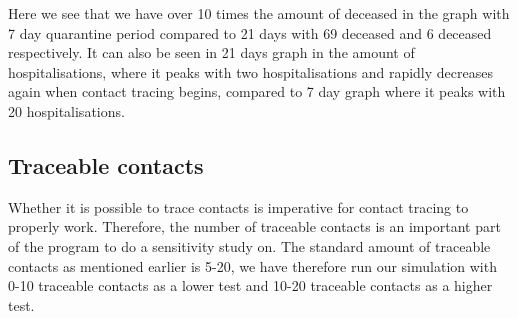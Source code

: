 Here we see that we have over 10 times the amount of deceased in the graph with 7 day quarantine period compared to 21 days with 69 deceased and 6 deceased respectively. It can also be seen in 21 days graph in the amount of hospitalisations, where it peaks with two hospitalisations and rapidly decreases again when contact tracing begins, compared to 7 day graph where it peaks with 20 hospitalisations.


\subsection{Traceable contacts}

Whether it is possible to trace contacts is imperative for contact tracing to properly work. Therefore, the number of traceable contacts is an important part of the program to do a sensitivity study on. The standard amount of traceable contacts as mentioned earlier is 5-20, we have therefore run our simulation with 0-10 traceable contacts as a lower test and 10-20 traceable contacts as a higher test.

